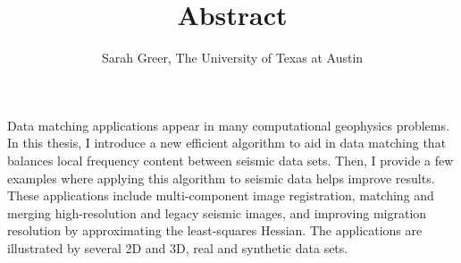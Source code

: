 \author{Sarah Greer, The University of Texas at Austin}
\title{Abstract}
\label{ch:abs}

Data matching applications appear in many computational geophysics problems.
In this thesis, I introduce a new efficient algorithm to aid in data matching that balances local frequency content between seismic data sets.
Then, I provide a few examples where applying this algorithm to seismic data helps improve results.
These applications include multi-component image registration, matching and merging high-resolution and legacy seismic images, and improving migration resolution by approximating the least-squares Hessian.
The applications are illustrated by several 2D and 3D, real and synthetic data sets.
